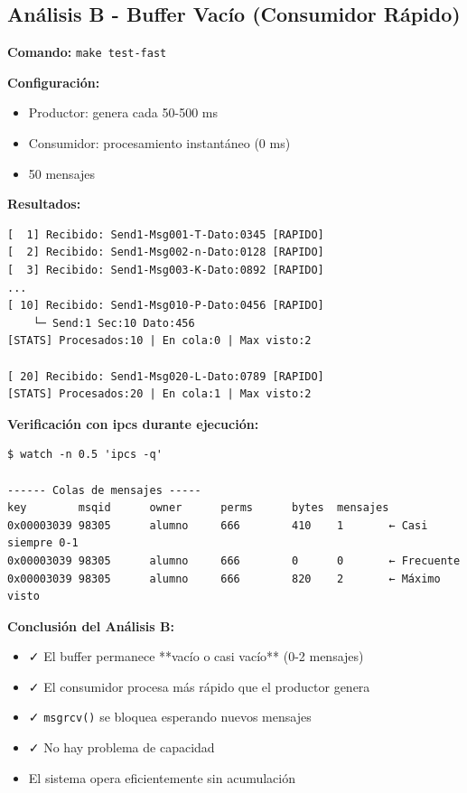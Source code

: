 \documentclass[10pt]{article}
\begin{document}
\subsection{Análisis B - Buffer Vacío (Consumidor Rápido)}

\textbf{Comando:} \texttt{make test-fast}

\textbf{Configuración:}
\begin{itemize}
  \item Productor: genera cada 50-500 ms
  \item Consumidor: procesamiento instantáneo (0 ms)
  \item 50 mensajes
\end{itemize}

\textbf{Resultados:}
\begin{lstlisting}[caption=Buffer mayormente vacío (fast-receive.log)]
[  1] Recibido: Send1-Msg001-T-Dato:0345 [RAPIDO]
[  2] Recibido: Send1-Msg002-n-Dato:0128 [RAPIDO]
[  3] Recibido: Send1-Msg003-K-Dato:0892 [RAPIDO]
...
[ 10] Recibido: Send1-Msg010-P-Dato:0456 [RAPIDO]
    └─ Send:1 Sec:10 Dato:456
[STATS] Procesados:10 | En cola:0 | Max visto:2

[ 20] Recibido: Send1-Msg020-L-Dato:0789 [RAPIDO]
[STATS] Procesados:20 | En cola:1 | Max visto:2
\end{lstlisting}

\textbf{Verificación con ipcs durante ejecución:}
\begin{verbatim}
$ watch -n 0.5 'ipcs -q'

------ Colas de mensajes -----
key        msqid      owner      perms      bytes  mensajes
0x00003039 98305      alumno     666        410    1       ← Casi siempre 0-1
0x00003039 98305      alumno     666        0      0       ← Frecuente
0x00003039 98305      alumno     666        820    2       ← Máximo visto
\end{verbatim}

\textbf{Conclusión del Análisis B:}
\begin{itemize}
  \item ✓ El buffer permanece **vacío o casi vacío** (0-2 mensajes)
  \item ✓ El consumidor procesa más rápido que el productor genera
  \item ✓ \texttt{msgrcv()} se bloquea esperando nuevos mensajes
  \item ✓ No hay problema de capacidad
  \item El sistema opera eficientemente sin acumulación
\end{itemize}
\end{document}
